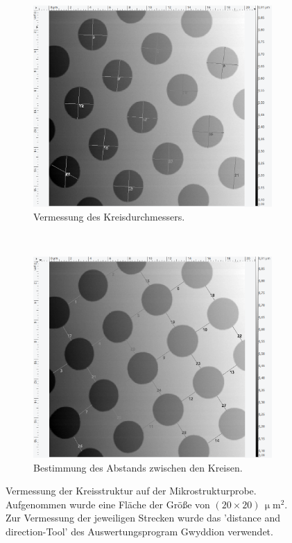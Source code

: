 \begin{figure}[H]
\centering
	\begin{subfigure}[t]{0.45\textwidth}
	\includegraphics[width=\textwidth]{AFM_auswertung/Kreis_durch_vor.png}
	\caption{Vermessung des Kreisdurchmessers.}
	\label{abb:kreisa}
	\end{subfigure}
	~
	\begin{subfigure}[t]{0.45\textwidth}
	\includegraphics[width=\textwidth]{AFM_auswertung/Kreis_abs_vor.png}
	\caption{Bestimmung des Abstands zwischen den Kreisen.}
	\label{abb:kreisb}
	\end{subfigure}
\caption{Vermessung der Kreisstruktur auf der Mikrostrukturprobe. Aufgenommen wurde eine Fl\"ache der Gr\"o{\ss}e von $(20 \times 20) \, \upmu \text{m}^2$. Zur Vermessung der jeweiligen Strecken wurde das 'distance and direction-Tool' des Auswertungsprogram Gwyddion verwendet.}
\label{abb:kreis}
\end{figure}
